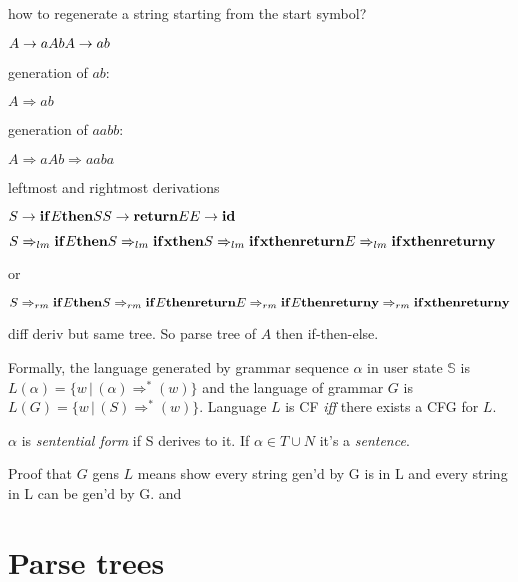 \documentclass[11pt,twocolumn,nocopyright]{sigplanconf}
\newcommand{\store}{\mathbb{S}}
\begin{document}
how to regenerate a string starting from the start symbol?

\noindent $
A \rightarrow a A b\\
A \rightarrow a b\\
$

generation of $ab$:
 
$A \Rightarrow ab$

generation of $aabb$:
 
$A \Rightarrow aAb \Rightarrow aaba$

leftmost and rightmost derivations
 
\noindent $
S \rightarrow {\bf if} E {\bf then} S\\
S \rightarrow {\bf return} E\\
E \rightarrow {\bf id}\\
$

$S \Rightarrow_{lm} {\bf if} E {\bf then} S \\
\Rightarrow_{lm} {\bf if} {\bf x} {\bf then} S \\
\Rightarrow_{lm} {\bf if} {\bf x} {\bf then} {\bf return} E \\
\Rightarrow_{lm} {\bf if} {\bf x} {\bf then} {\bf return} {\bf y}$

or

$S \Rightarrow_{rm} {\bf if} E {\bf then} S \\
\Rightarrow_{rm} {\bf if} E {\bf then} {\bf return} E \\
\Rightarrow_{rm} {\bf if} E {\bf then} {\bf return} {\bf y}\\
\Rightarrow_{rm} {\bf if} {\bf x} {\bf then} {\bf return} {\bf y}$

diff deriv but same tree. So parse tree of $A$ then if-then-else.

Formally, the language generated by grammar sequence $\alpha$ in user state $\store$ is
$L(\alpha)=\{ w \, | \, (\alpha) \Rightarrow^*
(w)\}$ and the language of grammar $G$ is $L(G) = \{ w \, | \,
(S) \Rightarrow^* (w)\}$. Language $L$ is CF {\em iff} there exists a CFG for $L$.

$\alpha$ is {\em sentential form} if S derives to it. If $\alpha \in T \cup N$ it's a {\em sentence}.

Proof that $G$ gens $L$ means show every string gen'd by G is in L and every string in L can be gen'd by G. and

\section{Parse trees}
\end{document}
